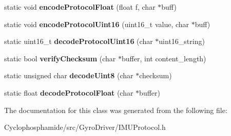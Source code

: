 \begin{DoxyCompactItemize}
\item 
\hypertarget{class_i_m_u_protocol_ad9d78b08dd74af878782c0f4a6c16951}{}static void {\bfseries encode\+Protocol\+Float} (float f, char $\ast$buff)\label{class_i_m_u_protocol_ad9d78b08dd74af878782c0f4a6c16951}

\item 
\hypertarget{class_i_m_u_protocol_af7156807ea5a0488e8eff2beeb1bac40}{}static void {\bfseries encode\+Protocol\+Uint16} (uint16\+\_\+t value, char $\ast$buff)\label{class_i_m_u_protocol_af7156807ea5a0488e8eff2beeb1bac40}

\item 
\hypertarget{class_i_m_u_protocol_a155fa4ff91c441d040988f656094f086}{}static uint16\+\_\+t {\bfseries decode\+Protocol\+Uint16} (char $\ast$uint16\+\_\+string)\label{class_i_m_u_protocol_a155fa4ff91c441d040988f656094f086}

\item 
\hypertarget{class_i_m_u_protocol_ade30772ce94446e5591501a705a22b3f}{}static bool {\bfseries verify\+Checksum} (char $\ast$buffer, int content\+\_\+length)\label{class_i_m_u_protocol_ade30772ce94446e5591501a705a22b3f}

\item 
\hypertarget{class_i_m_u_protocol_a9fae2bd9c887a61936343d7e02d745ed}{}static unsigned char {\bfseries decode\+Uint8} (char $\ast$checksum)\label{class_i_m_u_protocol_a9fae2bd9c887a61936343d7e02d745ed}

\item 
\hypertarget{class_i_m_u_protocol_a91e3d5e6f18c6ebf8499216df493d2f5}{}static float {\bfseries decode\+Protocol\+Float} (char $\ast$buffer)\label{class_i_m_u_protocol_a91e3d5e6f18c6ebf8499216df493d2f5}

\end{DoxyCompactItemize}


The documentation for this class was generated from the following file\+:\begin{DoxyCompactItemize}
\item 
Cyclophosphamide/src/\+Gyro\+Driver/I\+M\+U\+Protocol.\+h\end{DoxyCompactItemize}
